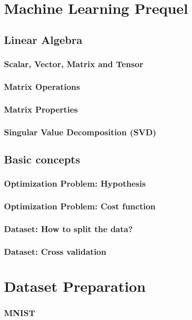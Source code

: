 \documentclass{beamer}
\begin{document}
\section{Machine Learning Prequel}

\subsection{Linear Algebra}

\begin{frame}
    \frametitle{Scalar, Vector, Matrix and Tensor}
\end{frame}

\begin{frame}
    \frametitle{Matrix Operations}
\end{frame}

\begin{frame}
    \frametitle{Matrix Properties}
\end{frame}

\begin{frame}
    \frametitle{Singular Value Decomposition (SVD)}
\end{frame}

\subsection{Basic concepts}

\begin{frame}
    \frametitle{Optimization Problem: Hypothesis}
\end{frame}

\begin{frame}
    \frametitle{Optimization Problem: Cost function}
\end{frame}

\begin{frame}
    \frametitle{Dataset: How to split the data?}
\end{frame}

\begin{frame}
    \frametitle{Dataset: Cross validation}
\end{frame}

\section{Dataset Preparation}

\begin{frame}
    \frametitle{MNIST}
\end{frame}
\end{document}
